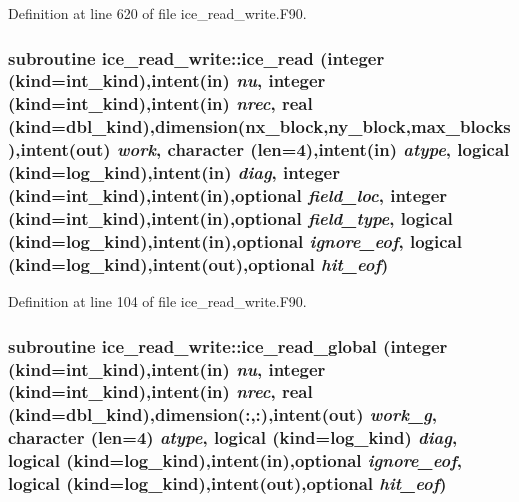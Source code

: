Definition at line 620 of file ice\_\-read\_\-write.F90.\hypertarget{namespaceice__read__write_a0a5831674445b8a414a0b73b554ad166}{
\subsubsection[{ice\_\-read}]{\setlength{\rightskip}{0pt plus 5cm}subroutine ice\_\-read\_\-write::ice\_\-read (integer (kind=int\_\-kind),intent(in) {\em nu}, \/  integer (kind=int\_\-kind),intent(in) {\em nrec}, \/  real (kind=dbl\_\-kind),dimension(nx\_\-block,ny\_\-block,max\_\-blocks),intent(out) {\em work}, \/  character (len=4),intent(in) {\em atype}, \/  logical (kind=log\_\-kind),intent(in) {\em diag}, \/  integer (kind=int\_\-kind),intent(in),optional {\em field\_\-loc}, \/  integer (kind=int\_\-kind),intent(in),optional {\em field\_\-type}, \/  logical (kind=log\_\-kind),intent(in),optional {\em ignore\_\-eof}, \/  logical (kind=log\_\-kind),intent(out),optional {\em hit\_\-eof})}}
\label{namespaceice__read__write_a0a5831674445b8a414a0b73b554ad166}


Definition at line 104 of file ice\_\-read\_\-write.F90.\hypertarget{namespaceice__read__write_a25d913eb64dad37cf58e9c095ad4627a}{
\subsubsection[{ice\_\-read\_\-global}]{\setlength{\rightskip}{0pt plus 5cm}subroutine ice\_\-read\_\-write::ice\_\-read\_\-global (integer (kind=int\_\-kind),intent(in) {\em nu}, \/  integer (kind=int\_\-kind),intent(in) {\em nrec}, \/  real (kind=dbl\_\-kind),dimension(:,:),intent(out) {\em work\_\-g}, \/  character (len=4) {\em atype}, \/  logical (kind=log\_\-kind) {\em diag}, \/  logical (kind=log\_\-kind),intent(in),optional {\em ignore\_\-eof}, \/  logical (kind=log\_\-kind),intent(out),optional {\em hit\_\-eof})}}
\label{namespaceice__read__write_a25d913eb64dad37cf58e9c095ad4627a}


